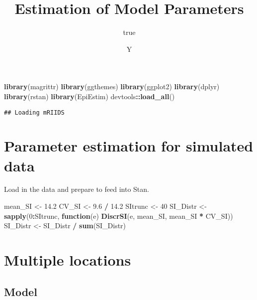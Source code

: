 \documentclass[11pt,]{article}
\title{Estimation of Model Parameters}
\author{true}
\date{Y}
\newenvironment{Shaded}{\begin{snugshade}}{\end{snugshade}}
\newcommand{\KeywordTok}[1]{\textcolor[rgb]{0.13,0.29,0.53}{\textbf{#1}}}
\newcommand{\DecValTok}[1]{\textcolor[rgb]{0.00,0.00,0.81}{#1}}
\newcommand{\FloatTok}[1]{\textcolor[rgb]{0.00,0.00,0.81}{#1}}
\newcommand{\StringTok}[1]{\textcolor[rgb]{0.31,0.60,0.02}{#1}}
\newcommand{\ControlFlowTok}[1]{\textcolor[rgb]{0.13,0.29,0.53}{\textbf{#1}}}
\newcommand{\OperatorTok}[1]{\textcolor[rgb]{0.81,0.36,0.00}{\textbf{#1}}}
\newcommand{\NormalTok}[1]{#1}
\begin{document}
\maketitle

\begin{Shaded}
\begin{Highlighting}[]
\KeywordTok{library}\NormalTok{(magrittr)}
\KeywordTok{library}\NormalTok{(ggthemes)}
\KeywordTok{library}\NormalTok{(ggplot2)}
\KeywordTok{library}\NormalTok{(dplyr)}
\KeywordTok{library}\NormalTok{(rstan)}
\KeywordTok{library}\NormalTok{(EpiEstim)}
\NormalTok{devtools}\OperatorTok{::}\KeywordTok{load_all}\NormalTok{()}
\end{Highlighting}
\end{Shaded}

\begin{verbatim}
## Loading mRIIDS
\end{verbatim}

\section{Parameter estimation for simulated
data}\label{parameter-estimation-for-simulated-data}

Load in the data and prepare to feed into Stan.

\begin{Shaded}
\begin{Highlighting}[]
\NormalTok{mean_SI  <-}\StringTok{ }\FloatTok{14.2}
\NormalTok{CV_SI    <-}\StringTok{ }\FloatTok{9.6} \OperatorTok{/}\StringTok{ }\FloatTok{14.2}
\NormalTok{SItrunc  <-}\StringTok{ }\DecValTok{40}
\NormalTok{SI_Distr <-}\StringTok{ }\KeywordTok{sapply}\NormalTok{(}\DecValTok{0}\OperatorTok{:}\NormalTok{SItrunc,}
                   \ControlFlowTok{function}\NormalTok{(e) }\KeywordTok{DiscrSI}\NormalTok{(e,}
\NormalTok{                                       mean_SI,}
\NormalTok{                                       mean_SI }\OperatorTok{*}\StringTok{ }\NormalTok{CV_SI))}
\NormalTok{SI_Distr <-}\StringTok{ }\NormalTok{SI_Distr }\OperatorTok{/}\StringTok{ }\KeywordTok{sum}\NormalTok{(SI_Distr)}
\end{Highlighting}
\end{Shaded}

\section{Multiple locations}\label{multiple-locations}

\subsection{Model}\label{model}
\end{document}

